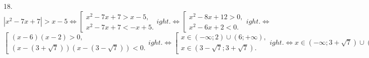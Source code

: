 18. $|x^2-7x+7|>x-5\Leftrightarrow \left[\begin{array}{l} x^2-7x+7>x-5,\\ x^2-7x+7<-x+5.\end{array}
ight.\Leftrightarrow
\left[\begin{array}{l} x^2-8x+12>0,\\ x^2-6x+2<0.\end{array}
ight.\Leftrightarrow$\\$
\left[\begin{array}{l} (x-6)(x-2)>0,\\ (x-(3+\sqrt{7}))(x-(3-\sqrt{7}))<0.\end{array}
ight.\Leftrightarrow
\left[\begin{array}{l} x\in(-\infty;2)\cup(6;+\infty),\\ x\in(3-\sqrt{7};3+\sqrt{7}).\end{array}
ight.\Leftrightarrow
x\in (-\infty;3+\sqrt{7})\cup(6;+\infty).$\\
